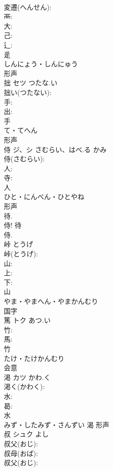 \documentclass[8pt]{extreport}
\begin{document}
\begin{CJK}{UTF8}{min}
\\	変遷(へんせん): 
\\	襾: 
\\	大: 
\\	己: 
\\	辶: 
\\	辵	
\\	しんにょう・しんにゅう	
\\	形声 
\\	拙	セツ	つたな.い		
\\	拙い(つたない): 
\\	手: 
\\	出: 
\\	手	
\\	て・てへん	
\\	形声 
\\	侍	ジ、シ	さむらい、はべ.る	かみ	
\\	侍(さむらい): 
\\	人: 
\\	寺: 
\\	人	
\\	ひと・にんべん・ひとやね	
\\	形声 
\\	待. 
\\	侍! 待 
\\	侍.
\\	峠		とうげ		
\\	峠(とうげ): 
\\	山: 
\\	上: 
\\	下: 
\\	山	
\\	やま・やまへん・やまかんむり	
\\	国字 
\\	篤	トク	あつ.い		
\\	竹: 
\\	馬: 
\\	竹	
\\	たけ・たけかんむり	
\\	会意 
\\	渇	カツ	かわ.く		
\\	渇く(かわく): 
\\	水: 
\\	曷: 
\\	水	
\\	みず・したみず・さんずい	渴	形声 
\\	叔	シュク		よし	
\\	叔父(おじ): 
\\	叔母(おば): 
\\	叔父(おじ): 

\end{CJK}
\end{document}
